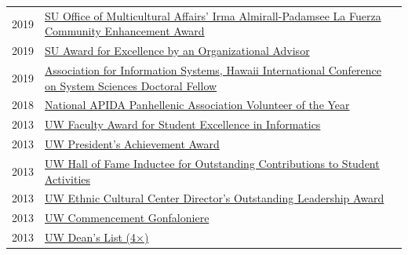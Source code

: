 \documentclass[12pt]{article}
\begin{document}
{\begin{longtable}{R{0.75in}p{5.0in}}
\footnotesize{2019} & 
\href{https://news.syr.edu/blog/2019/04/29/44-stars-of-excellence-awards-honor-members-of-campus-community/}{SU Office of Multicultural Affairs' Irma Almirall-Padamsee La Fuerza Community Enhancement Award}\\

\footnotesize{2019} &\href{https://news.syr.edu/blog/2019/04/29/44-stars-of-excellence-awards-honor-members-of-campus-community/}{SU Award for Excellence by an Organizational Advisor}\\

\footnotesize{2019} &
\href{https://x.com/bdosono/status/1082439167512961024}{Association for Information Systems, Hawaii International Conference on System Sciences Doctoral Fellow}\\

\footnotesize{2018} &
\href{https://www.napahq.org/2018-napa-standards-of-excellence-award-recipients/}{National APIDA Panhellenic Association Volunteer of the Year}\\

\footnotesize{2013} & \href{https://ischool.uw.edu/news/2016/12/2013-ischool-convocation-celebrates-achievement-and-community}{UW Faculty Award for Student Excellence in Informatics}\\

\footnotesize{2013} & \href{https://www.washington.edu/omad/celebration/recognition-scholarship-recipients/2013-celebration-scholarship-recipients/}{UW President's Achievement Award}\\

\footnotesize{2013} & \href{https://hub.washington.edu/whats-happening/hub-awards/}{UW Hall of Fame Inductee for Outstanding Contributions to Student Activities}\\

\footnotesize{2013} & \href{https://www.facebook.com/EthnicCulturalCenter/photos/a.10151638127531422.1073741830.124987626421/10151638128881422/}{UW Ethnic Cultural Center Director's Outstanding Leadership Award}\\

\footnotesize{2013} & \href{https://www.facebook.com/UWiSchool/posts/10151645734368695}{UW Commencement Gonfaloniere}\\

\footnotesize{2013} & \href{https://www.yakimaherald.com/news/education/school-news-sept/article_af5885a3-bcbc-5925-bb87-a84844c6d36a.html}{UW Dean's List (4×)}\\


\end{longtable}}
\end{document}
